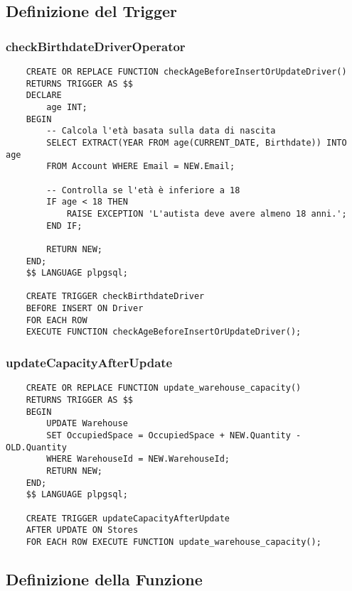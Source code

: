 \subsection{Definizione del Trigger}

\subsubsection{checkBirthdateDriverOperator}

\begin{lstlisting}
    CREATE OR REPLACE FUNCTION checkAgeBeforeInsertOrUpdateDriver()
    RETURNS TRIGGER AS $$
    DECLARE
        age INT;
    BEGIN
        -- Calcola l'età basata sulla data di nascita
        SELECT EXTRACT(YEAR FROM age(CURRENT_DATE, Birthdate)) INTO age
        FROM Account WHERE Email = NEW.Email;

        -- Controlla se l'età è inferiore a 18
        IF age < 18 THEN
            RAISE EXCEPTION 'L'autista deve avere almeno 18 anni.';
        END IF;

        RETURN NEW;
    END;
    $$ LANGUAGE plpgsql;

    CREATE TRIGGER checkBirthdateDriver
    BEFORE INSERT ON Driver
    FOR EACH ROW
    EXECUTE FUNCTION checkAgeBeforeInsertOrUpdateDriver();
\end{lstlisting}

\newpage

\subsubsection{updateCapacityAfterUpdate}

\begin{lstlisting}
    CREATE OR REPLACE FUNCTION update_warehouse_capacity()
    RETURNS TRIGGER AS $$
    BEGIN
        UPDATE Warehouse
        SET OccupiedSpace = OccupiedSpace + NEW.Quantity - OLD.Quantity
        WHERE WarehouseId = NEW.WarehouseId;
        RETURN NEW;
    END;
    $$ LANGUAGE plpgsql;

    CREATE TRIGGER updateCapacityAfterUpdate
    AFTER UPDATE ON Stores
    FOR EACH ROW EXECUTE FUNCTION update_warehouse_capacity();
\end{lstlisting}

\subsection{Definizione della Funzione}

